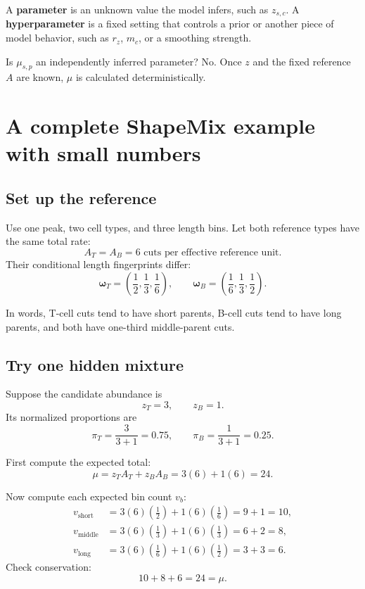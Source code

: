 \documentclass[11pt]{article}
\newcommand{\term}[1]{\textbf{\color{tealdark}#1}}
\begin{document}
A \term{parameter} is an unknown value the model infers, such as \(z_{s,c}\). A
\term{hyperparameter} is a fixed setting that controls a prior or another piece of
model behavior, such as \(r_z\), \(m_c\), or a smoothing strength.

\begin{checkpoint}
Is \(\mu_{s,p}\) an independently inferred parameter? No. Once \(z\) and the fixed
reference \(A\) are known, \(\mu\) is calculated deterministically.
\end{checkpoint}

\section{A complete ShapeMix example with small numbers}

\subsection{Set up the reference}

Use one peak, two cell types, and three length bins. Let both reference types have
the same total rate:
\[
A_T=A_B=6\text{ cuts per effective reference unit}.
\]
Their conditional length fingerprints differ:
\[
\boldsymbol{\omega}_T=
\left(\frac12,\frac13,\frac16\right),
\qquad
\boldsymbol{\omega}_B=
\left(\frac16,\frac13,\frac12\right).
\]

In words, T-cell cuts tend to have short parents, B-cell cuts tend to have long
parents, and both have one-third middle-parent cuts.

\subsection{Try one hidden mixture}

Suppose the candidate abundance is
\[
z_T=3,\qquad z_B=1.
\]
Its normalized proportions are
\[
\pi_T=\frac{3}{3+1}=0.75,\qquad
\pi_B=\frac{1}{3+1}=0.25.
\]

First compute the expected total:
\[
\mu=z_TA_T+z_BA_B=3(6)+1(6)=24.
\]

Now compute each expected bin count \(v_b\):
\[
\begin{aligned}
v_{\text{short}}
&=3(6)\left(\frac12\right)+1(6)\left(\frac16\right)
=9+1=10,\\
v_{\text{middle}}
&=3(6)\left(\frac13\right)+1(6)\left(\frac13\right)
=6+2=8,\\
v_{\text{long}}
&=3(6)\left(\frac16\right)+1(6)\left(\frac12\right)
=3+3=6.
\end{aligned}
\]
Check conservation:
\[
10+8+6=24=\mu.
\]
\end{document}
